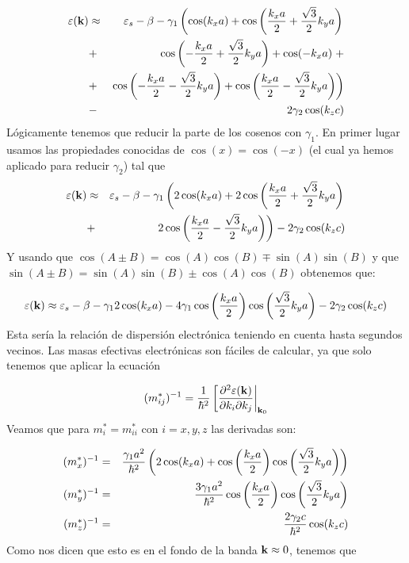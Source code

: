 \begin{solucion}
\begin{enumerate}[label=\alph*)]
		 \begin{eqnarray*}
			 \varepsilon(\mathbf{k}) & \approx & \varepsilon_s - \beta -\gamma_1 \left( \cos (k_x a) + \cos \left(  \frac{k_x  a}{2} + \frac{\sqrt{3}}{2} k_y a   \right) \right. \\  & +  &  \left.    
			 \cos \left(  -\frac{k_x  a}{2} + \frac{\sqrt{3}}{2} k_y a   \right)+ \cos (-k_x a)	 \right. + \\ & + & \left. \cos \left(  -\frac{k_x  a}{2} - \frac{\sqrt{3}}{2} k_y a   \right) + \cos \left(  \frac{k_x  a}{2} - \frac{\sqrt{3}}{2} k_y a   \right) \right)  \\ & - & 2 \gamma_2 \cos (k_z c)   
		 \end{eqnarray*}
		 Lógicamente tenemos que reducir la parte de los cosenos con $\gamma_1$. En primer lugar usamos las propiedades conocidas de $\cos(x)=\cos(-x)$ (el cual ya hemos aplicado para reducir $\gamma_2$) tal que 
		 \begin{eqnarray*}
		 	\varepsilon(\mathbf{k}) & \approx & \varepsilon_s - \beta -\gamma_1 \left( 2\cos (k_x a) + 2\cos \left(  \frac{k_x  a}{2} + \frac{\sqrt{3}}{2} k_y a   \right) \right. \\  & +  &  \left.    
		 	2\cos \left(  \frac{k_x  a}{2} - \frac{\sqrt{3}}{2} k_y a   \right) \right) - 2 \gamma_2 \cos (k_z c)   
		 \end{eqnarray*}
		 Y usando que $\cos (A \pm B) = \cos (A) \cos (B) \mp \sin (A) \sin (B)$ y que $\sin (A\pm B) = \sin (A) \sin(B) \pm \cos(A) \cos(B)$ obtenemos que:
		 
		 \begin{equation*}
		 	\varepsilon(\mathbf{k})  \approx  \varepsilon_s - \beta -\gamma_1 2\cos (k_x a) - 4 \gamma_1 \cos \left(  \frac{k_x  a}{2}  \right) \cos \left(  \frac{\sqrt{3}}{2} k_y a   \right)  - 2 \gamma_2 \cos (k_z c)  
		 \end{equation*}
		 Esta sería la relación de dispersión electrónica teniendo en cuenta hasta segundos vecinos. Las masas efectivas electrónicas son fáciles de calcular, ya que solo tenemos que aplicar la ecuación
		 
		 \begin{equation*}
		 	(m_{ij}^*)^{-1} = \frac{1}{\hbar^2} \eval[\parciales{^2 \varepsilon(\kn)}{k_i \partial k_j}|_{\kn_0}
		 \end{equation*}
		 Veamos que para $m_i^* = m_{ii}^*$ con $i=x,y,z$ las derivadas son:
		 
		 \begin{eqnarray*}
		 	(m_{x}^*)^{-1} & = &  \frac{\gamma_1 a^2}{\hbar^2} \left( 2\cos(k_x a) +  \cos \left(  \frac{k_x  a}{2}  \right) \cos \left(  \frac{\sqrt{3}}{2} k_y a   \right) \right)
		 	  \\
		 	(m_{y}^*)^{-1} & =  & \frac{3\gamma_1 a^2}{\hbar^2}  \cos \left(  \frac{k_x  a}{2}  \right) \cos \left(  \frac{\sqrt{3}}{2} k_y a   \right) \\
		 	(m_{z}^*)^{-1} & = & \frac{2 \gamma_2 c}{\hbar^2} \cos (k_z c)
		 \end{eqnarray*}		 
		 Como nos dicen que esto es en el fondo de la banda $\mathbf{k}\approx 0$, tenemos que
		 

\end{enumerate}
\end{solucion}
